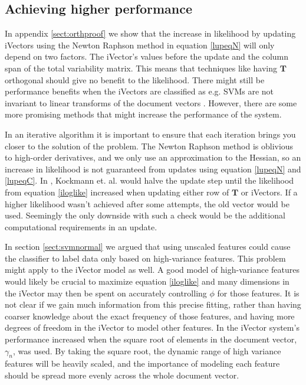 \subsection{Achieving higher performance}
\label{sect:higherlike}

In appendix \ref{sect:orthproof} we show that the increase in likelihood by updating iVectors using the Newton Raphson method in equation \ref{lupeqN} will only depend on two factors. The iVector's values before the update and the column span of the total variability matrix. This means that techniques like having $\mathbf{T}$ orthogonal should give no benefit to the likelihood. There might still be performance benefits when the iVectors are classified as e.g. SVMs are not invariant to linear transforms of the document vectors \cite{wan2005speaker}. However, there are some more promising methods that might increase the performance of the system.

In an iterative algorithm it is important to ensure that each iteration brings you closer to the solution of the problem. The Newton Raphson method is oblivious to high-order derivatives, and we only use an approximation to the Hessian, so an increase in likelihood is not guaranteed from updates using equation \ref{lupeqN} and \ref{lupeqC}. In \cite{kockmann2010prosodic}, Kockmann et. al. would halve the update step until the likelihood from equation \ref{iloglike} increased when updating either row of $\mathbf{T}$ or iVectors. If a higher likelihood wasn't achieved after some attempts, the old vector would be used.  Seemingly the only downside with such a check would be the additional computational requirements in an update.

In section \ref{sect:svmnormal} we argued that using unscaled features could cause the classifier to label data only based on high-variance features. This problem might apply to the iVector model as well. A good model of high-variance features would likely be crucial to maximize equation \ref{iloglike} and many dimensions in the iVector may then be spent on accurately controlling $\phi$ for those features. It is not clear if we gain much information from this precise fitting, rather than having coarser knowledge about the exact frequency of those features, and having more degrees of freedom in the iVector to model other features. In \cite{lrivector} the iVector system's performance increased when the square root of elements in the document vector, $\gamma_n$, was used. By taking the square root, the dynamic range of high variance features will be heavily scaled, and the importance of modeling each feature should be spread more evenly across the whole document vector.

